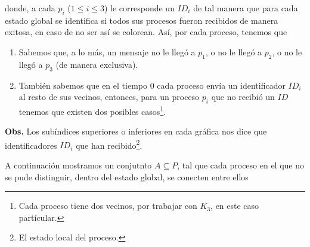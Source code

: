 donde, a cada $p_i$ ($1 \leq i \leq 3$) le corresponde un $ID_i$ de
tal manera que para cada estado global se identifica si todos sus
procesos fueron recibidos de manera exitosa, en caso de no ser así
se colorean.
Así, por cada proceso, tenemos que
\begin{enumerate}
\item Sabemos que, a lo más, un mensaje no le llegó a $p_1$,
o no le llegó a $p_2$, o no le llegó a $p_3$ (de manera exclusiva).
\item También sabemos que en el tiempo $0$ cada proceso envía
un identificador $ID_i$ al resto de sus vecinos, entonces,
para un proceso $p_i$ que no recibió un $ID$ tenemos que existen
dos posibles casos\footnote{Cada proceso tiene dos vecinos, por trabajar
con $K_3$, en este caso partícular.}.
\end{enumerate}

\textbf{Obs.} Los subíndices superiores o inferiores en cada gráfica
nos dice que identificadores $ID_i$ que han recibido\footnote{El estado local
del proceso.}.
\newline

A continuación mostramos un conjutnto  $A \subseteq P$, tal que cada proceso
en el que no se pude distinguir, dentro del estado global, se conecten entre
ellos

